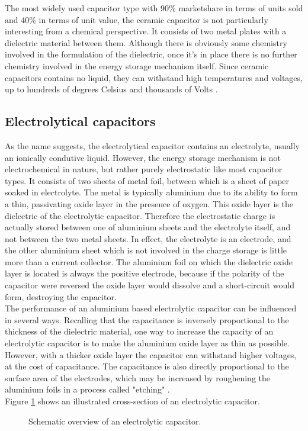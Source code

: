 \documentclass[12pt]{article} %
\begin{document}
The most widely used capacitor type with 90\% marketshare in terms of units sold and 40\% in terms of unit value, the ceramic capacitor is not particularly interesting from a chemical perspective.
It consists of two metal plates with a dielectric material between them.
Although there is obviously some chemistry involved in the formulation of the dielectric, once it's in place there is no further chemistry involved in the energy storage mechanism itself.
Since ceramic capacitors contains no liquid, they can withstand high temperatures and voltages, up to hundreds of degrees Celsius and thousands of Volts \cite{pan_brief_2010}.

\subsection{Electrolytical capacitors}

As the name suggests, the electrolytical capacitor contains an electrolyte, usually an ionically condutive liquid.
However, the energy storage mechanism is not electrochemical in nature, but rather purely electrostatic like most capacitor types.
It consists of two sheets of metal foil, between which is a sheet of paper soaked in electrolyte.
The metal is typically aluminium due to its ability to form a thin, passivating oxide layer in the presence of oxygen.
This oxide layer is the dielectric of the electrolytic capacitor.
Therefore the electrostatic charge is actually stored between one of aluminium sheets and the electrolyte itself, and not between the two metal sheets.
In effect, the electrolyte is an electrode, and the other aluminium sheet which is not involved in the charge storage is little more than a current collector.
The aluminium foil on which the dielectric oxide layer is located is always the positive electrode, because if the polarity of the capacitor were reversed the oxide layer would dissolve and a short-circuit would form, destroying the capacitor.
\\
The performance of an aluminium based electrolytic capacitor can be influenced in several ways.
Recalling that the capacitance is inversely proportional to the thickness of the dielectric material, one way to increase the capacity of an electrolytic capacitor is to make the aluminium oxide layer as thin as possible.
However, with a thicker oxide layer the capacitor can withstand higher voltages, at the cost of capacitance.
The capacitance is also directly proportional to the surface area of the electrodes, which may be increased by roughening the aluminium foils in a process called "etching" \cite{cdm_cornell_dubilier_aeappguide.pdf_????}.
\\
Figure \ref{fig:electrolytic} shows an illustrated cross-section of an electrolytic capacitor.
\begin{figure}[H] %
\caption{Schematic overview of an electrolytic capacitor.}
\label{fig:electrolytic}
\end{figure}
\end{document}
